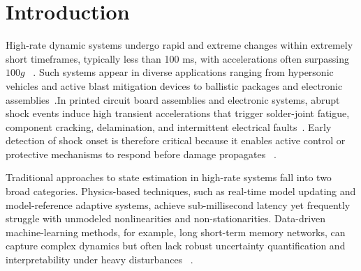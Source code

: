 \documentclass[colorlinks,upint,subscriptcorrection,varvw,hyphenate,balance,greek,russian,vietnamese,german]{asmeconf} %
\begin{document}

%
%
%


\section{Introduction}



High-rate dynamic systems undergo rapid and extreme changes within extremely short timeframes, typically less than 100 ms, with accelerations often surpassing \(100g\) ~\cite{Chua2025Probabilisticmachinelearning}. Such systems appear in diverse applications ranging from hypersonic vehicles and active blast mitigation devices to ballistic packages and electronic assemblies~\cite{Razmarashooli2025Realtimestate}.In printed circuit board assemblies and electronic systems, abrupt shock events induce high transient accelerations that trigger solder-joint fatigue, component cracking, delamination, and intermittent electrical faults~\cite{Zhou2023FailureAnalysisPrinted}. Early detection of shock onset is therefore critical because it enables active control or protective mechanisms to respond before damage propagates  ~\cite{Tanweer2024topologicalframeworkidentifying}.

Traditional approaches to state estimation in high-rate systems fall into two broad categories. Physics-based techniques, such as real-time model updating and model-reference adaptive systems, achieve sub-millisecond latency yet frequently struggle with unmodeled nonlinearities and non-stationarities. Data-driven machine-learning methods, for example, long short-term memory networks, can capture complex dynamics but often lack robust uncertainty quantification and interpretability under heavy disturbances ~\cite{Yan2021Onlineparameterestimation}.
\end{document}
